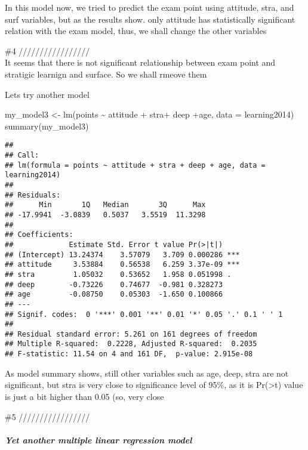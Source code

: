 \documentclass[
]{article}
\newenvironment{Shaded}{\begin{snugshade}}{\end{snugshade}}
\newcommand{\AttributeTok}[1]{\textcolor[rgb]{0.77,0.63,0.00}{#1}}
\newcommand{\FunctionTok}[1]{\textcolor[rgb]{0.00,0.00,0.00}{#1}}
\newcommand{\NormalTok}[1]{#1}
\newcommand{\OtherTok}[1]{\textcolor[rgb]{0.56,0.35,0.01}{#1}}
\newcommand{\SpecialCharTok}[1]{\textcolor[rgb]{0.00,0.00,0.00}{#1}}
\begin{document}
In this model now, we tried to predict the exam point using attitude,
stra, and surf variables, but as the results show. only attitude has
statistically significant relation with the exam model, thus, we shall
change the other variables

\#4 /////////////////\\
It seems that there is not significant relationship between exam point
and stratigic learnign and surface. So we shall rmeove them

Lets try another model

\begin{Shaded}
\begin{Highlighting}[]
\NormalTok{my\_model3 }\OtherTok{\textless{}{-}} \FunctionTok{lm}\NormalTok{(points }\SpecialCharTok{\textasciitilde{}}\NormalTok{ attitude }\SpecialCharTok{+}\NormalTok{ stra}\SpecialCharTok{+}\NormalTok{ deep }\SpecialCharTok{+}\NormalTok{age, }\AttributeTok{data =}\NormalTok{ learning2014)}
\FunctionTok{summary}\NormalTok{(my\_model3)}
\end{Highlighting}
\end{Shaded}

\begin{verbatim}
## 
## Call:
## lm(formula = points ~ attitude + stra + deep + age, data = learning2014)
## 
## Residuals:
##      Min       1Q   Median       3Q      Max 
## -17.9941  -3.0839   0.5037   3.5519  11.3298 
## 
## Coefficients:
##             Estimate Std. Error t value Pr(>|t|)    
## (Intercept) 13.24374    3.57079   3.709 0.000286 ***
## attitude     3.53884    0.56538   6.259 3.37e-09 ***
## stra         1.05032    0.53652   1.958 0.051998 .  
## deep        -0.73226    0.74677  -0.981 0.328273    
## age         -0.08750    0.05303  -1.650 0.100866    
## ---
## Signif. codes:  0 '***' 0.001 '**' 0.01 '*' 0.05 '.' 0.1 ' ' 1
## 
## Residual standard error: 5.261 on 161 degrees of freedom
## Multiple R-squared:  0.2228, Adjusted R-squared:  0.2035 
## F-statistic: 11.54 on 4 and 161 DF,  p-value: 2.915e-08
\end{verbatim}

As model summary shows, still other variables such as age, deep, stra
are not significant, but stra is very close to significance level of
95\%, as it is Pr(\textgreater\textbar t\textbar) value is just a bit
higher than 0.05 (so, very close

\#5 /////////////////

\hypertarget{yet-another-multiple-linear-regression-model}{%
\subparagraph{Yet another multiple linear regression
model}\label{yet-another-multiple-linear-regression-model}}
\end{document}
